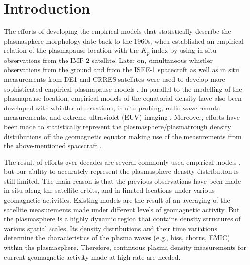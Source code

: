 \documentclass[a4paper]{article}
\begin{document}
\section*{\sc Introduction}
\indent \indent The efforts of developing the empirical models that statistically describe the plasmasphere morphology date back to the 1960s, when \citet{binsack1967plasmapause} established an empirical relation of the plasmapause location with the $K_p$ index by using in situ observations from the IMP 2 satellite.
Later on, simultaneous whistler observations from the ground and from the ISEE-1 spacecraft as well as in situ measurements from DE1 and CRRES satellites were used to develop more sophisticated empirical plasmapause models \citep{carpenter1992isee, moldwin2002new, o2003empirical}.
In parallel to the modelling of the plasmapause location, empirical models of the equatorial density have also been developed with whistler observations, in situ probing, radio wave remote measurements, and extreme ultraviolet (EUV) imaging \citep{carpenter1992isee, sheeley2001empirical, denton2004electron, reinisch2004plasmaspheric, song2005magnetospheric, tu2006empirical, larsen2007correlation}.
Moreover, efforts have been made to statistically represent the plasmasphere/plasmatrough density distributions off the geomagnetic equator making use of the measurements from the above-mentioned spacecraft \citep{gallagher1988empirical, gallagher1998simple, gallagher2000global, goldstein2001latitudinal, denton2004electron, huang2004developing, reinisch2004plasmaspheric, tu2006empirical}.

The result of efforts over decades are several commonly used empirical models \citep{sheeley2001empirical, ozhogin2012field}, but our ability to accurately represent the plasmasphere density distribution is still limited. The main reason is that the previous observations have been made in situ along the satellite orbits, and in limited locations under various geomagnetic activities. Existing models are the result of an averaging of the satellite measurements made under different levels of geomagnetic activity. But the plasmasphere is a highly dynamic region that contains density structures of various spatial scales. Its density distributions and their time variations determine the characteristics of the plasma waves (e.g., hiss, chorus, EMIC) within the plasmasphere. Therefore, continuous plasma density measurements for current geomagnetic activity made at high rate are needed.
\end{document}
